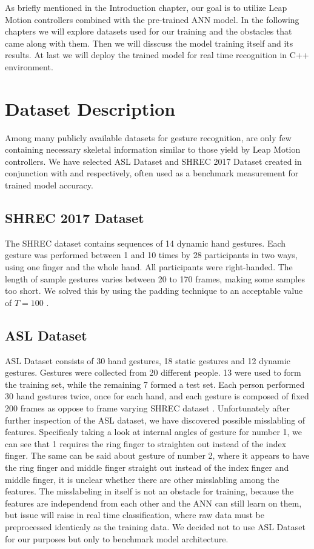 
As briefly mentioned in the Introduction chapter, our goal is to utilize Leap Motion controllers combined with the pre-trained ANN model. In the following chapters we will explore datasets used for our training and the obstacles that came along with them. Then we will disscuss the model training itself and its results. At last we will deploy the trained model for real time recognition in C++ environment.


\section{Dataset Description}

Among many publicly available datasets for gesture recognition, are only few containing necessary skeletal information similar to those yield by Leap Motion controllers. We have selected ASL Dataset and SHREC 2017 Dataset created in conjunction with \cite{avola} and \cite{shrec} respectively, often used as a benchmark measurement for trained model accuracy.

\subsection{SHREC 2017 Dataset}

The SHREC dataset contains sequences of 14 dynamic hand gestures. Each gesture was performed between 1 and 10 times by 28 participants in two ways, using one finger and the whole hand. All participants were right-handed. The length of sample gestures varies between 20 to 170 frames, making some samples too short. We solved this by using the padding technique to an acceptable value of $T=100$ \cite{shrec}.

\subsection{ASL Dataset}

ASL Dataset consists of 30 hand gestures, 18 static gestures and 12 dynamic gestures. Gestures were collected from 20 different people. 13 were used to form the training set, while the remaining 7 formed a test set. Each person performed 30 hand gestures twice, once for each hand, and each gesture is composed of fixed 200 frames as oppose to frame varying SHREC dataset \cite{avola}. Unfortunately after further inspection of the ASL dataset, we have discovered possible misslabling of features. Specificaly taking a look at internal angles of gesture for number 1, we can see that 1 requires the ring finger to straighten out instead of the index finger. The same can be said about gesture of number 2, where it appears to have the ring finger and middle finger straight out instead of the index finger and middle finger, it is unclear whether there are other misslabling among the features. The misslabeling in itself is not an obstacle for training, because the features are independend from each other and the ANN can still learn on them, but issue will raise in real time classification, where raw data must be preprocessed identicaly as the training data. We decided not to use ASL Dataset for our purposes but only to benchmark model architecture.

